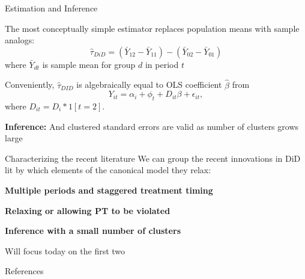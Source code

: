 \documentclass[aspectratio = 169, 12pt]{beamer}
\begin{document}
\begin{frame}{Estimation and Inference}
  \begin{wideitemize}
    \item
    The most conceptually simple estimator replaces population means with sample analogs:
    $$\hat{\tau}_{DiD} = (\bar{Y}_{12} - \bar{Y}_{11}) - (\bar{Y}_{02} - \bar{Y}_{01}) $$
    \noindent where $\bar{Y}_{dt}$ is sample mean for group $d$ in period $t$

    \pause
    \item
    Conveniently, $\hat\tau_{DID}$ is algebraically equal to OLS coefficient $\hat\beta$ from
    \begin{equation}
      Y_{it} = \alpha_i + \phi_t + D_{it} \beta  + \epsilon_{it}, \label{eqn: TWFE-2-periods}
    \end{equation}
    \noindent where $D_{it} = D_i * 1[t=2]$.
    \pause
    \item
    \textbf{Inference:} And clustered standard errors are valid as number of clusters grows large
  \end{wideitemize}
\end{frame}

\begin{frame}{Characterizing the recent literature}
  We can group the recent innovations in DiD lit by which elements of the canonical model they relax:
  \medskip

  \begin{wideitemize}
    \item
    \textbf{Multiple periods and staggered treatment timing}

    \item
    \textbf{Relaxing or allowing PT to be violated}

    \item
    \textbf{Inference with a small number of clusters}

  \end{wideitemize}
  \medskip
  Will focus today on the first two
\end{frame}


\backupbegin
\begin{frame}{References}
  
\end{frame}
\backupend
\end{document}
